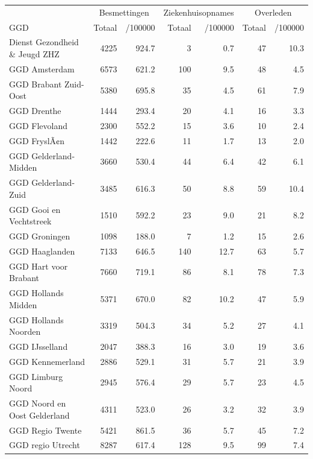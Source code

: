\documentclass[
  english,
  man,floatsintext]{apa6}
\begin{document}
\begin{table}[H]
\centering\begingroup\fontsize{10}{12}\selectfont

\begin{threeparttable}
\begin{tabular}{lrrrrrr}
\toprule
\multicolumn{1}{c}{ } & \multicolumn{2}{c}{Besmettingen} & \multicolumn{2}{c}{Ziekenhuisopnames} & \multicolumn{2}{c}{Overleden} \\
\cmidrule(l{3pt}r{3pt}){2-3} \cmidrule(l{3pt}r{3pt}){4-5} \cmidrule(l{3pt}r{3pt}){6-7}
GGD & Totaal & /100000 & Totaal & /100000 & Totaal & /100000\\
\midrule
Dienst Gezondheid \& Jeugd ZHZ & 4225 & 924.7 & 3 & 0.7 & 47 & 10.3\\
GGD Amsterdam & 6573 & 621.2 & 100 & 9.5 & 48 & 4.5\\
GGD Brabant Zuid-Oost & 5380 & 695.8 & 35 & 4.5 & 61 & 7.9\\
GGD Drenthe & 1444 & 293.4 & 20 & 4.1 & 16 & 3.3\\
GGD Flevoland & 2300 & 552.2 & 15 & 3.6 & 10 & 2.4\\
GGD FryslÃ¢n & 1442 & 222.6 & 11 & 1.7 & 13 & 2.0\\
GGD Gelderland-Midden & 3660 & 530.4 & 44 & 6.4 & 42 & 6.1\\
GGD Gelderland-Zuid & 3485 & 616.3 & 50 & 8.8 & 59 & 10.4\\
GGD Gooi en Vechtstreek & 1510 & 592.2 & 23 & 9.0 & 21 & 8.2\\
GGD Groningen & 1098 & 188.0 & 7 & 1.2 & 15 & 2.6\\
GGD Haaglanden & 7133 & 646.5 & 140 & 12.7 & 63 & 5.7\\
GGD Hart voor Brabant & 7660 & 719.1 & 86 & 8.1 & 78 & 7.3\\
GGD Hollands Midden & 5371 & 670.0 & 82 & 10.2 & 47 & 5.9\\
GGD Hollands Noorden & 3319 & 504.3 & 34 & 5.2 & 27 & 4.1\\
GGD IJsselland & 2047 & 388.3 & 16 & 3.0 & 19 & 3.6\\
GGD Kennemerland & 2886 & 529.1 & 31 & 5.7 & 21 & 3.9\\
GGD Limburg Noord & 2945 & 576.4 & 29 & 5.7 & 23 & 4.5\\
GGD Noord en Oost Gelderland & 4311 & 523.0 & 26 & 3.2 & 32 & 3.9\\
GGD Regio Twente & 5421 & 861.5 & 36 & 5.7 & 45 & 7.2\\
GGD regio Utrecht & 8287 & 617.4 & 128 & 9.5 & 99 & 7.4\\

\end{tabular}
\end{threeparttable}
\end{table}
\end{document}
